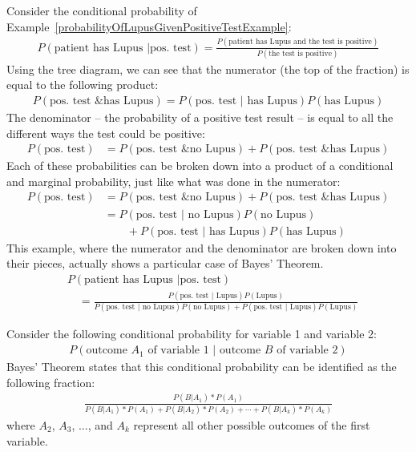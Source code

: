 Consider the conditional probability of Example~\ref{probabilityOfLupusGivenPositiveTestExample}:
\begin{align*}
P(\text{patient has Lupus } | \text{pos. test}) = \frac{P(\text{patient has Lupus and the test is positive})}{P(\text{the test is positive})}
\end{align*}
Using the tree diagram, we can see that the numerator (the top of the fraction) is equal to the following product:
\begin{align*}
P(\text{pos. test \& has Lupus}) = P(\text{pos. test } | \text{ has Lupus})P(\text{has Lupus})
\end{align*}
The denominator -- the probability of a positive test result -- is equal to all the different ways the test could be positive:
\begin{align*}
P(\text{pos. test}) &= P(\text{pos. test \& no Lupus}) + P(\text{pos. test \& has Lupus}) %
\end{align*}
Each of these probabilities can be broken down into a product of a conditional and marginal probability, just like what was done in the numerator:
\begin{align*}
P(\text{pos. test}) &= P(\text{pos. test \& no Lupus}) + P(\text{pos. test \& has Lupus}) \\
	&= P(\text{pos. test } | \text{ no Lupus})P(\text{no Lupus}) \\
			   &\qquad + P(\text{pos. test } | \text{ has Lupus})P(\text{has Lupus})
\end{align*}
This example, where the numerator and the denominator are broken down into their pieces, actually shows a particular case of Bayes' Theorem.
\begin{align*}
& P(\text{patient has Lupus } | \text{pos. test})  \\
& \quad= \frac{P(\text{pos. test } | \text{ Lupus})P(\text{Lupus})}
	{P(\text{pos. test } | \text{ no Lupus})P(\text{no Lupus}) + P(\text{pos. test } | \text{ Lupus})P(\text{Lupus})}
\end{align*}

\begin{termBox}{
Consider the following conditional probability for variable 1 and variable 2:\vspace{-1.5mm}
\begin{align*}
P(\text{outcome $A_1$ of variable 1 } | \text{ outcome $B$ of variable 2})
\end{align*}
Bayes' Theorem states that this conditional probability can be identified as the following fraction:\vspace{-1.5mm}
\begin{align}
\frac{P(B | A_1)*P(A_1)}
	{P(B | A_1)*P(A_1) + P(B | A_2)*P(A_2) + \cdots + P(B | A_k)*P(A_k)}
	\label{equationOfBayesTheorem}
\end{align}
where $A_2$, $A_3$, ..., and $A_k$ represent all other possible outcomes of the first variable.}
\end{termBox}

